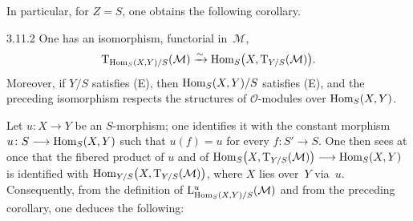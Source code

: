 In particular, for \(Z=S\), one obtains the following corollary.

\begin{corollary}{3.11.2}\label{II.3.11.2}
One has an isomorphism, functorial in~\(\mathcal{M}\),
\[
\mathrm{T}_{\operatorname{Hom}_{S}(X,Y)/S}(\mathcal{M})
\xrightarrow{\sim}
\operatorname{Hom}_{S}\bigl(X,\mathrm{T}_{Y/S}(\mathcal{M})\bigr).
\]
Moreover, if \(Y/S\) satisfies \textup{(E)}, then \(\operatorname{Hom}_{S}(X,Y)/S\)
satisfies \textup{(E)}, and the preceding isomorphism respects the structures
of \(\mathcal{O}\)-modules over \(\operatorname{Hom}_{S}(X,Y)\).
\end{corollary}

{\renewcommand{\thefootnote}{(37)}}
Let \(u\colon X\to Y\) be an \(S\)-morphism; one identifies it with the
constant morphism \(u\colon S\longrightarrow\operatorname{Hom}_{S}(X,Y)\) such that \(u(f)=u\) for
every \(f\colon S'\to S\). One then sees at once that the fibered product of
\(u\) and of
\(\operatorname{Hom}_{S}\bigl(X,\mathrm{T}_{Y/S}(\mathcal{M})\bigr)\longrightarrow\operatorname{Hom}_{S}(X,Y)\)
is identified with
\(\operatorname{Hom}_{Y/S}\bigl(X,\mathrm{T}_{Y/S}(\mathcal{M})\bigr)\), where \(X\) lies
over~\(Y\) via~\(u\). Consequently, from the definition of
\(\mathrm{L}^{u}_{\operatorname{Hom}_{S}(X,Y)/S}(\mathcal{M})\) and from the preceding
corollary, one deduces the following:
